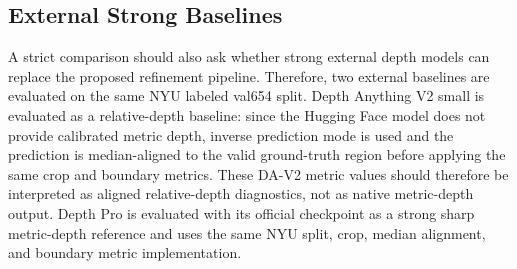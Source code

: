 \documentclass{ieeeaccess}
\begin{document}
\begin{table}[t]
\centering
\small
\caption{NYU val654 boundary-density subset evaluation. The split uses tertiles of the ground-truth log-depth boundary pixel fraction. Each subset contains 218 samples.}
\label{tab:nyu-density}
\end{table}

\subsection{External Strong Baselines}

A strict comparison should also ask whether strong external depth models can replace the proposed refinement pipeline. Therefore, two external baselines are evaluated on the same NYU labeled val654 split. Depth Anything V2 small is evaluated as a relative-depth baseline: since the Hugging Face model does not provide calibrated metric depth, inverse prediction mode is used and the prediction is median-aligned to the valid ground-truth region before applying the same crop and boundary metrics. These DA-V2 metric values should therefore be interpreted as aligned relative-depth diagnostics, not as native metric-depth output. Depth Pro is evaluated with its official checkpoint as a strong sharp metric-depth reference and uses the same NYU split, crop, median alignment, and boundary metric implementation.
\end{document}
